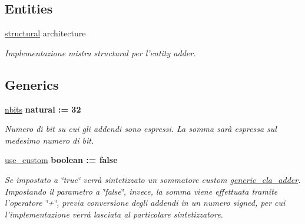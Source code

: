 \subsection*{Entities}
\begin{DoxyCompactItemize}
\item 
\hyperlink{classadder_1_1structural}{structural} architecture
\begin{DoxyCompactList}\small\item\em Implementazione mistra structural per l'entity adder. \end{DoxyCompactList}\end{DoxyCompactItemize}
\subsection*{Generics}
 \begin{DoxyCompactItemize}
\item 
\hyperlink{group___adder_gae1435c07d0cd54b521535e2f8de6f94e}{nbits} {\bfseries {\bfseries \textcolor{vhdlchar}{natural}\textcolor{vhdlchar}{ }\textcolor{vhdlchar}{ }\textcolor{vhdlchar}{\+:}\textcolor{vhdlchar}{=}\textcolor{vhdlchar}{ }\textcolor{vhdlchar}{ } \textcolor{vhdldigit}{32} \textcolor{vhdlchar}{ }}}
\begin{DoxyCompactList}\small\item\em Numero di bit su cui gli addendi sono espressi. La somma sarà espressa sul medesimo numero di bit. \end{DoxyCompactList}\item 
\hyperlink{group___adder_gadf05ca347ec6d3c85740dc697469b3db}{use\+\_\+custom} {\bfseries {\bfseries \textcolor{vhdlchar}{boolean}\textcolor{vhdlchar}{ }\textcolor{vhdlchar}{ }\textcolor{vhdlchar}{\+:}\textcolor{vhdlchar}{=}\textcolor{vhdlchar}{ }\textcolor{vhdlchar}{ }\textcolor{vhdlchar}{ }\textcolor{vhdlchar}{ }\textcolor{vhdlchar}{false}\textcolor{vhdlchar}{ }}}
\begin{DoxyCompactList}\small\item\em Se impostato a \char`\"{}true\char`\"{} verrà sintetizzato un sommatore custom \hyperlink{classgeneric__cla__adder}{generic\+\_\+cla\+\_\+adder}. Impostando il parametro a \char`\"{}false\char`\"{}, invece, la somma viene effettuata tramite l'operatore \char`\"{}+\char`\"{}, previa conversione degli addendi in un numero signed, per cui l'implementazione verrà lasciata al particolare sintetizzatore. \end{DoxyCompactList}\end{DoxyCompactItemize}
